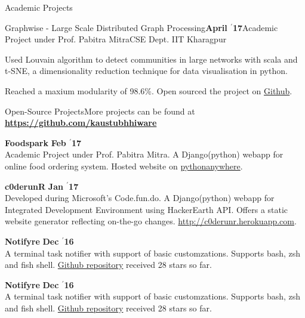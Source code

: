 \documentclass{resume} %
\begin{document}
\begin{rSection}{Academic Projects}
\begin{rSubsection}{ \large Graphwise - Large Scale Distributed Graph Processing}{\textbf{\large April $^{\prime}$17}}{Academic Project under Prof. Pabitra Mitra}{CSE Dept. IIT Kharagpur}
\item Used Louvain algorithm to detect communities in large networks with scala and t-SNE, a dimensionality reduction technique for data visualisation in python.

\item Reached a maxium modularity of 98.6\%. Open sourced the project on \href{https://github.com/kaustubhhiware/Graphwise}{Github}.
\end{rSubsection}


\end{rSection}


\begin{rSection}{\large Open-Source Projects}{}{More projects can be found at \textbf{\large \url{https://github.com/kaustubhhiware}}}

{\bf \large Foodspark} \hfill \textbf{Feb $^{\prime}$17} \\ 
Academic Project under Prof. Pabitra Mitra. A Django(python) webapp for online food ordering system. Hosted website on \href{http://foodkgp.pythonanywhere.com}{pythonanywhere}.

{\bf \large c0derunR} \hfill \textbf{Jan $^{\prime}$17} \\ 
Developed during Microsoft's Code.fun.do. A Django(python) webapp for Integrated Development Environment using HackerEarth API. Offers a static website generator reflecting on-the-go changes. \url{http://c0derunr.herokuapp.com}.

{\bf \large Notifyre} \hfill \textbf{Dec $^{\prime}$16} \\ 
A terminal task notifier with support of basic customzations. Supports bash, zsh and fish shell. \href{https://github.com/kaustubhhiware/ NotiFyre}{Github repository} received 28 stars so far.

{\bf \large Notifyre} \hfill \textbf{Dec $^{\prime}$16} \\ 
A terminal task notifier with support of basic customzations. Supports bash, zsh and fish shell. \href{https://github.com/kaustubhhiware/ NotiFyre}{Github repository} received 28 stars so far.

\end{rSection}
\end{document}
